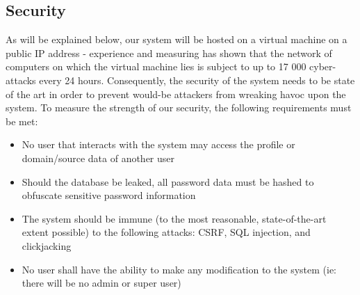 \documentclass[12pt]{article}
\begin{document}
\subsection{Security}
As will be explained below, our system will be hosted on a virtual machine on a public IP address - experience and measuring has shown that the network of computers on which the virtual machine lies is subject to up to 17 000 cyber-attacks every 24 hours. Consequently, the security of the system needs to be state of the art in order to prevent would-be attackers from wreaking havoc upon the system. To measure the strength of our security, the following requirements must be met:
\begin{itemize}
    \item No user that interacts with the system may access the profile or domain/source data of another user
    \item Should the database be leaked, all password data must be hashed to obfuscate sensitive password information
    \item The system should be immune (to the most reasonable, state-of-the-art extent possible) to the following attacks: CSRF, SQL injection, and clickjacking
    \item No user shall have the ability to make any modification to the system (ie: there will be no admin or super user)
\end{itemize}
\end{document}
